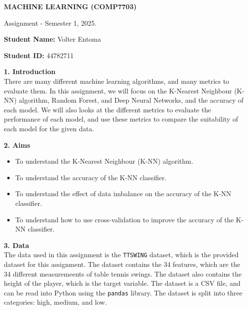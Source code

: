 \documentclass[12pt]{article}
\begin{document}
\begin{center}

{\Large  {\bf MACHINE LEARNING (COMP7703)}

Assignment - Semester 1, 2025.

\vspace{20pt}

{\large \textbf{Student Name:} Volter Entoma}
\vspace{10pt}

{\large \textbf{Student ID:} 44782711}

}
\end{center}

\vspace{20pt}

\textbf{1. Introduction}
\\
There are many different machine learning algorithms, and many metrics to evaluate them. In this assignment, we will focus on the K-Nearest Neighbour (K-NN) algorithm, Random Forest, and Deep Neural Networks, and the accuracy of each model. We will also looks at the different metrics to evaluate the performance of each model, and use these metrics to compare the suitability of each model for the given data.

\vspace{20pt}

\textbf{2. Aims}
\begin{itemize}
	\item To understand the K-Nearest Neighbour (K-NN) algorithm.
	\item To understand the accuracy of the K-NN classifier.
	\item To understand the effect of data imbalance on the accuracy of the K-NN classifier.
	\item To understand how to use cross-validation to improve the accuracy of the K-NN classifier.
\end{itemize}

\vspace{20pt}

\textbf{3. Data}
\\
The data used in this assignment is the \texttt{TTSWING} dataset, which is the provided dataset for this assignment. The dataset contains the 34 features, which are the 34 different measuremeents of table tennis swings. The dataset also contains the height of the player, which is the target variable. The dataset is a CSV file, and can be read into Python using the \texttt{pandas} library. The dataset is split into three categories: high, medium, and low.
\end{document}
